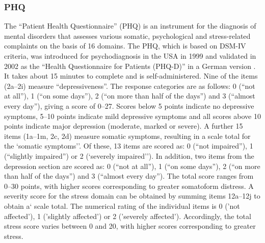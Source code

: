 \subsubsection{\acl{PHQ}}
The ``Patient Health Questionnaire'' (\acs{PHQ}) is an instrument for the diagnosis of mental disorders that assesses various somatic, psychological and stress-related complaints on the basis of 16 domains. The \acs{PHQ}, which is based on DSM-IV criteria, was introduced for psychodiagnosis in the USA in 1999 \cite{spitzer1999phq} and validated in 2002 as the ``Health Questionnaire for Patients (PHQ-D)'' in a German version \cite{lowe2002phq}. It takes about 15 minutes to complete and is self-administered. Nine of the items (2a--2i) measure ``depressiveness''. The response categories are as follows: 0 (``not at all''), 1 (``on some days''), 2 (``on more than half of the days'') and 3 (``almost every day''), giving a score of 0--27. Scores below 5 points indicate no depressive symptoms, 5--10 points indicate mild depressive symptoms and all scores above 10 points indicate major depression (moderate, marked or severe). A further 15 items (1a--1m, 2c, 2d) measure somatic symptoms, resulting in a scale total for the `somatic symptoms''. Of these, 13 items are scored as: 0 (``not impaired''), 1 (``slightly impaired'') or 2 (`severely impaired''). In addition, two items from the depression section are scored as: 0 (``not at all''), 1 (``on some days''), 2 (``on more than half of the days'') and 3 (``almost every day''). The total score ranges from 0--30 points, with higher scores corresponding to greater somatoform distress. 
A severity score for the stress domain can be obtained by summing items 12a--12j to obtain a` scale total. The numerical rating of the individual items is 0 ('not affected'), 1 ('slightly affected') or 2 ('severely affected'). Accordingly, the total stress score varies between 0 and 20, with higher scores corresponding to greater stress.

